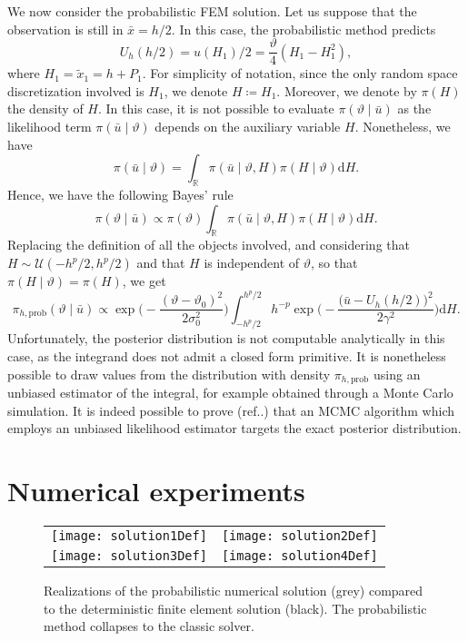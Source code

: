 \documentclass{siamart1116}
\numberwithin{theorem}{section}
\renewcommand{\theta}{\vartheta}
\newcommand{\R}{\mathbb{R}}
\newcommand{\defeq}{\coloneqq}
\newcommand{\dd}{\mathrm{d}}
\newcommand{\corr}[1]{{\color{bordeaux}#1}}
\begin{document}
We now consider the probabilistic FEM solution. Let us suppose that the observation is still in $\bar x = h / 2$. In this case, the probabilistic method predicts
\begin{equation}
	U_h(h/2) = u(H_1) / 2 = \frac{\theta}{4}(H_1 - H_1^2),
\end{equation}
where $H_1 = \tilde x_1 = h + P_1$. For simplicity of notation, since the only random space discretization involved is $H_1$, we denote $H \defeq H_1$. Moreover, we denote by $\pi(H)$ the density of $H$. In this case, it is not possible to evaluate $\pi(\theta \mid \bar u)$ as the likelihood term $\pi(\bar u \mid \theta)$ depends on the auxiliary variable $H$. Nonetheless, we have
\begin{equation}
	\pi(\bar u \mid \theta) = \int_\R \pi(\bar u \mid \theta, H) \pi(H \mid \theta) \dd H.
\end{equation}
Hence, we have the following Bayes' rule
\begin{equation}
	\pi(\theta \mid \bar u) \propto \pi(\theta) \int_\R \pi(\bar u \mid \theta, H) \pi(H \mid \theta) \dd H.
\end{equation}
Replacing the definition of all the objects involved, and considering that $H \sim \mathcal{U}(-h^p/2, h^p/2)$ and that $H$ is independent of $\theta$, so that $\pi(H \mid \theta) = \pi(H)$, we get
\begin{equation}
	\pi_{h,\mathrm{prob}}(\theta \mid \bar u) \propto \exp\Big(-\frac{(\theta-\theta_0)^2}{2\sigma_0^2}\Big)\int_{-h^p/2}^{h^p/2} h^{-p}\exp\Big(-\frac{\big(\bar u - U_h(h/2)\big)^2}{2\gamma^2}\Big) \dd H.
\end{equation}
Unfortunately, \corr{the posterior distribution is not computable analytically in this case, as the integrand does not admit a closed form primitive.} It is nonetheless possible to draw values from the distribution with density $\pi_{h, \mathrm{prob}}$ using an unbiased estimator of the integral, for example obtained through a Monte Carlo simulation. It is indeed possible to prove (ref..) that an MCMC algorithm which employs an unbiased likelihood estimator targets the exact posterior distribution. 

\section{Numerical experiments} 

\begin{figure}[t!]
	\begin{center}
		\begin{tabular}{cc}%
			\texttt{[image: solution1Def]} & \texttt{[image: solution2Def]} \\
			\texttt{[image: solution3Def]} & \texttt{[image: solution4Def]} \\
		\end{tabular}
	\end{center}
	\caption{Realizations of the probabilistic numerical solution (grey) compared to the deterministic finite element solution (black). The probabilistic method collapses to the classic solver.}
	\label{fig:ResultsCollapse}
\end{figure}
\end{document}

